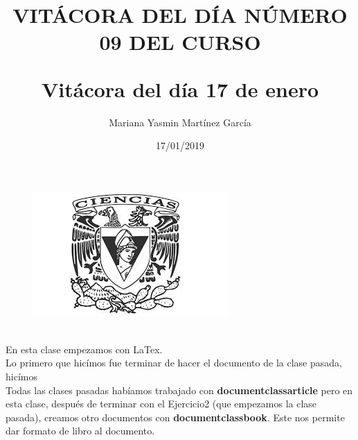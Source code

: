 \documentclass{article}
\title{\Huge\item\color{blue}\textbf{VITÁCORA DEL DÍA NÚMERO 09 DEL CURSO}}
\author{\Large Mariana Yasmin Martínez García}
\date{\Large 17/01/2019}
\begin{document}
\begin{figure}[t]
	\centering
	\includegraphics[width=0.7\linewidth]{Imagenes/1}
	\caption{}
	\label{fig:1}
\end{figure}

	\maketitle
		
	\newpage
	
	\title{\huge\textbf{Vitácora del día 17 de enero\\}} \\
	En esta clase empezamos con LaTex.\\
	Lo primero que hicímos fue terminar de hacer el documento de la clase pasada, hicímos \\
	Todas las clases pasadas habíamos trabajado con \textbf{documentclass{article}} pero en esta clase, después de terminar con el Ejercicio2 (que empezamos la clase pasada), creamos otro documentos con \textbf{documentclass{book}}. Este nos permite dar formato de libro al documento.
\end{document}
